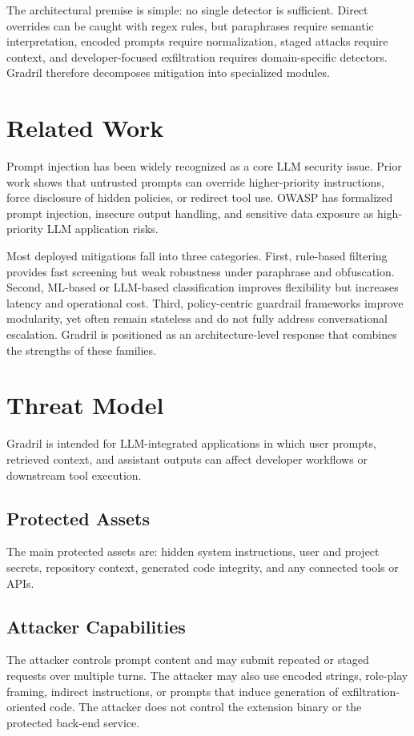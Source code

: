\documentclass[journal]{IEEEtran}
\begin{document}
The architectural premise is simple: no single detector is sufficient. Direct overrides can be caught with regex rules, but paraphrases require semantic interpretation, encoded prompts require normalization, staged attacks require context, and developer-focused exfiltration requires domain-specific detectors. Gradril therefore decomposes mitigation into specialized modules.

\section{Related Work}
Prompt injection has been widely recognized as a core LLM security issue. Prior work shows that untrusted prompts can override higher-priority instructions, force disclosure of hidden policies, or redirect tool use. OWASP has formalized prompt injection, insecure output handling, and sensitive data exposure as high-priority LLM application risks.

Most deployed mitigations fall into three categories. First, rule-based filtering provides fast screening but weak robustness under paraphrase and obfuscation. Second, ML-based or LLM-based classification improves flexibility but increases latency and operational cost. Third, policy-centric guardrail frameworks improve modularity, yet often remain stateless and do not fully address conversational escalation. Gradril is positioned as an architecture-level response that combines the strengths of these families.

\section{Threat Model}
Gradril is intended for LLM-integrated applications in which user prompts, retrieved context, and assistant outputs can affect developer workflows or downstream tool execution.

\subsection{Protected Assets}
The main protected assets are: hidden system instructions, user and project secrets, repository context, generated code integrity, and any connected tools or APIs.

\subsection{Attacker Capabilities}
The attacker controls prompt content and may submit repeated or staged requests over multiple turns. The attacker may also use encoded strings, role-play framing, indirect instructions, or prompts that induce generation of exfiltration-oriented code. The attacker does not control the extension binary or the protected back-end service.
\end{document}
